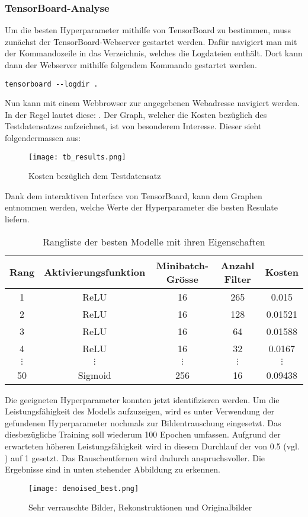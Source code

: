 \subsubsection{TensorBoard-Analyse}
Um die besten Hyperparameter mithilfe von TensorBoard zu bestimmen, muss
zunächst der TensorBoard-Webserver gestartet werden. Dafür navigiert man
mit der Kommandozeile in das Verzeichnis, welches die Logdateien enthält.
Dort kann dann der Webserver mithilfe folgendem Kommando gestartet werden.
\begin{verbatim}
tensorboard --logdir .
\end{verbatim}
Nun kann mit einem Webbrowser zur angegebenen Webadresse navigiert werden. In
der Regel lautet diese: .
Der Graph, welcher die Kosten bezüglich des Testdatensatzes aufzeichnet, ist von besonderem
Interesse. Dieser sieht folgendermassen aus:
\para{}
\begin{figure}[h!]
  \centering
  \texttt{[image: tb\_results.png]}
  \caption{Kosten bezüglich dem Testdatensatz}
\end{figure}
\para{}
Dank dem interaktiven Interface von TensorBoard, kann dem Graphen entnommen
werden, welche Werte der Hyperparameter die besten Resulate liefern.

\para{}
\begin{table}[h!]
  \centering
  \begin{tabular}{ |c|c|c|c|c| }
    \hline
    Rang & Aktivierungsfunktion & Minibatch-Grösse & Anzahl Filter & Kosten \\
    \hline
    1 & ReLU & 16 & 265 & 0.015 \\
    2 & ReLU & 16 & 128 & 0.01521 \\
    3 & ReLU & 16 & 64 & 0.01588 \\
    4 & ReLU & 16 & 32 & 0.0167 \\
    $\vdots$ & $\vdots$ & $\vdots$ & $\vdots$ & $\vdots$ \\
    50 & Sigmoid & 256 & 16 & 0.09438 \\
    \hline
  \end{tabular}
  \caption{Rangliste der besten Modelle mit ihren Eigenschaften}
  \label{tab:rangliste}
\end{table}
\para{}
Die geeigneten Hyperparameter konnten jetzt identifizieren werden. Um die
Leistungsfähigkeit des Modells aufzuzeigen, wird es unter Verwendung
der gefundenen Hyperparameter nochmals zur Bildentrauschung eingesetzt.
Das diesbezügliche Training soll wiederum 100 Epochen umfassen.
Aufgrund der erwarteten höheren Leistungsfähigkeit wird in diesem Durchlauf der
 von 0.5 (vgl. ) auf
1 gesetzt. Das Rauschentfernen wird dadurch anspruchsvoller. Die Ergebnisse sind
in unten stehender Abbildung zu erkennen.
\begin{figure}[h!]
  \centering
  \texttt{[image: denoised\_best.png]}
  \caption{Sehr verrauschte Bilder, Rekonstruktionen und Originalbilder}
\end{figure}


